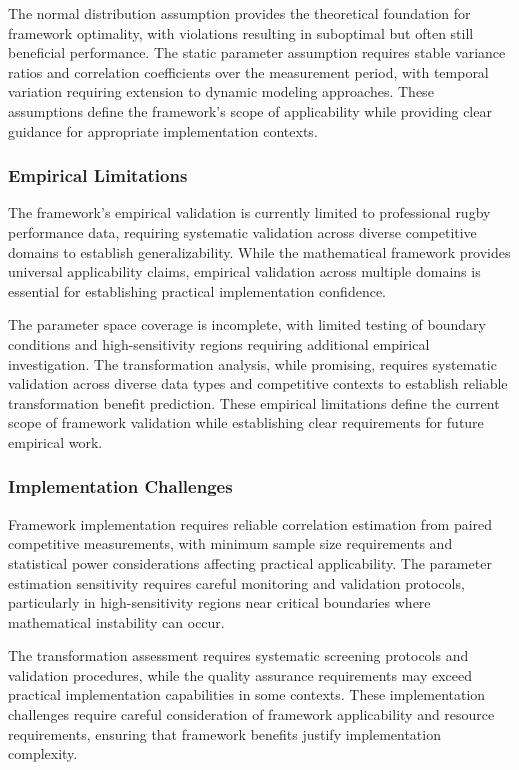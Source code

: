 The normal distribution assumption provides the theoretical foundation for framework optimality, with violations resulting in suboptimal but often still beneficial performance. The static parameter assumption requires stable variance ratios and correlation coefficients over the measurement period, with temporal variation requiring extension to dynamic modeling approaches. These assumptions define the framework's scope of applicability while providing clear guidance for appropriate implementation contexts.

\subsubsection{Empirical Limitations}

The framework's empirical validation is currently limited to professional rugby performance data, requiring systematic validation across diverse competitive domains to establish generalizability. While the mathematical framework provides universal applicability claims, empirical validation across multiple domains is essential for establishing practical implementation confidence.

The parameter space coverage is incomplete, with limited testing of boundary conditions and high-sensitivity regions requiring additional empirical investigation. The transformation analysis, while promising, requires systematic validation across diverse data types and competitive contexts to establish reliable transformation benefit prediction. These empirical limitations define the current scope of framework validation while establishing clear requirements for future empirical work.

\subsubsection{Implementation Challenges}

Framework implementation requires reliable correlation estimation from paired competitive measurements, with minimum sample size requirements and statistical power considerations affecting practical applicability. The parameter estimation sensitivity requires careful monitoring and validation protocols, particularly in high-sensitivity regions near critical boundaries where mathematical instability can occur.

The transformation assessment requires systematic screening protocols and validation procedures, while the quality assurance requirements may exceed practical implementation capabilities in some contexts. These implementation challenges require careful consideration of framework applicability and resource requirements, ensuring that framework benefits justify implementation complexity.

